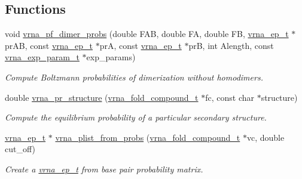 \subsection*{Functions}
\begin{DoxyCompactItemize}
\item 
void \mbox{\hyperlink{group__part__func__global_gaa1e39e73afb51fbaf4ae38f0c066c46b}{vrna\+\_\+pf\+\_\+dimer\+\_\+probs}} (double F\+AB, double FA, double FB, \mbox{\hyperlink{group__struct__utils__plist_gab9ac98ab55ded9fb90043b024b915aca}{vrna\+\_\+ep\+\_\+t}} $\ast$pr\+AB, const \mbox{\hyperlink{group__struct__utils__plist_gab9ac98ab55ded9fb90043b024b915aca}{vrna\+\_\+ep\+\_\+t}} $\ast$prA, const \mbox{\hyperlink{group__struct__utils__plist_gab9ac98ab55ded9fb90043b024b915aca}{vrna\+\_\+ep\+\_\+t}} $\ast$prB, int Alength, const \mbox{\hyperlink{group__energy__parameters_ga01d8b92fe734df8d79a6169482c7d8d8}{vrna\+\_\+exp\+\_\+param\+\_\+t}} $\ast$exp\+\_\+params)
\begin{DoxyCompactList}\small\item\em Compute Boltzmann probabilities of dimerization without homodimers. \end{DoxyCompactList}\item 
double \mbox{\hyperlink{group__part__func__global_ga882c35d9dd775c1275593b3b6a966bec}{vrna\+\_\+pr\+\_\+structure}} (\mbox{\hyperlink{group__fold__compound_ga1b0cef17fd40466cef5968eaeeff6166}{vrna\+\_\+fold\+\_\+compound\+\_\+t}} $\ast$fc, const char $\ast$structure)
\begin{DoxyCompactList}\small\item\em Compute the equilibrium probability of a particular secondary structure. \end{DoxyCompactList}\item 
\mbox{\hyperlink{group__struct__utils__plist_gab9ac98ab55ded9fb90043b024b915aca}{vrna\+\_\+ep\+\_\+t}} $\ast$ \mbox{\hyperlink{group__part__func__global_ga94f6efc0b8d8712b023452794a0a5bd2}{vrna\+\_\+plist\+\_\+from\+\_\+probs}} (\mbox{\hyperlink{group__fold__compound_ga1b0cef17fd40466cef5968eaeeff6166}{vrna\+\_\+fold\+\_\+compound\+\_\+t}} $\ast$vc, double cut\+\_\+off)
\begin{DoxyCompactList}\small\item\em Create a \mbox{\hyperlink{group__struct__utils__plist_gab9ac98ab55ded9fb90043b024b915aca}{vrna\+\_\+ep\+\_\+t}} from base pair probability matrix. \end{DoxyCompactList}\end{DoxyCompactItemize}
